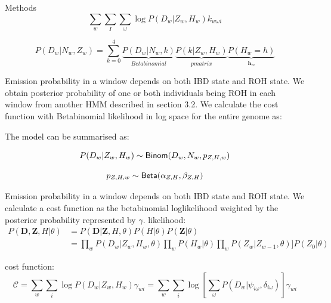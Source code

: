 \documentclass[12pt, letterpaper]{article}
\newcommand{\BZ}{\mathbf{Z}}
\begin{document}
Methods
$$\sum_{w} \sum_{I}\sum_\omega \log P(D_{w}|Z_w, H_w)k_{w\omega i}$$



$$P(D_w | N_w, Z_w) = \sum_{k=0}^4 
\underbrace{P(D_w | N_w, k)}_{Betabinomial}
\underbrace{P(k | Z_w, H_w)}_{p matrix}
\underbrace{P(H_w =h)}_{\mathbf{h}_w}
$$

Emission probability in a window depends on both IBD state and ROH state. We obtain posterior probability of one or both individuals being ROH in each window from another HMM described in section 3.2. We calculate the cost function with Betabinomial likelihood in log space for the entire genome as:

The model can be summarised as:

\begin{equation}\label{eq:6}
P(D_w|Z_w,H_w) \sim {\sf Binom}(D_w, N_w, p_{Z,H,w})
\end{equation}

\begin{equation}\label{eq:7}
p_{Z,H,w} \sim {\sf Beta}(\alpha_{Z,H}, \beta_{Z,H})
\end{equation}

Emission probability in a window depends on both IBD state and ROH state. We calculate a cost function as the betabinomial loglikelihood weighted by the posterior probability represented by $\gamma$.
likelihood:
\begin{align}
P(\mathbf{D},\BZ, H|\theta) &= P(\mathbf{D}|\mathbf{Z},H,\theta) P(H |\theta) P(\BZ|\theta)\nonumber\\
&= \prod_{w}  P(D_w|Z_w,  H_w, \theta) \prod_w P(H_w | \theta) \prod_{w} P(Z_w|Z_{w-1}, \theta)] P(Z_0| \theta) 
\end{align}

cost function:
\begin{equation}
    \mathcal{C} = 
       \sum_{w} \sum_{i} \log P(D_{w}|Z_w, H_w)\gamma_{wi}=
    \sum_{w} \sum_{i} 
    \log \left[\sum_{\omega}P(D_{w}|\psi_{i\omega},\delta_{i\omega}) \right] \gamma_{wi}
\end{equation}
\end{document}
